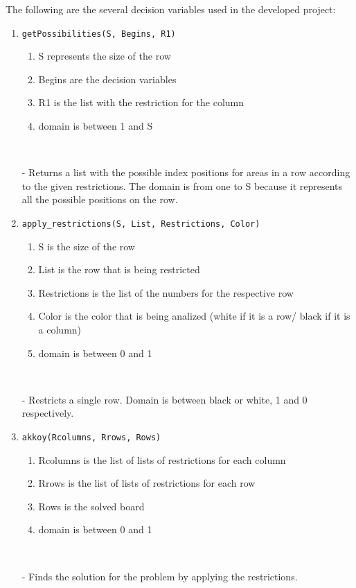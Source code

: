 \documentclass[runningheads,a4paper]{llncs}
\begin{document}
	The following are the several decision variables used in the developed project: 
		\begin{enumerate}
			\item \verb|getPossibilities(S, Begins, R1)|
			\begin{enumerate}
				\item S represents the size of the row
				\item Begins are the decision variables
				\item R1 is the list with the restriction for the column
				\item domain is between 1 and S 
			\end{enumerate}
		\

			 - Returns a list with the possible index positions for areas in a row according to the given restrictions.
			The domain is from one to S because it represents all the possible positions on the row.

			 \item \verb|apply_restrictions(S, List, Restrictions, Color)|
			\begin{enumerate}
				\item S is the size of the row
				\item List is the row that is being restricted
				\item Restrictions is the list of the numbers for the respective row
				\item Color is the color that is being analized (white if it is a row/ black if it is a column)
				\item domain is between 0 and 1
			\end{enumerate}
		\

			- Restricts a single row. Domain is between black or white, 1 and 0 respectively.
	

			\item \verb|akkoy(Rcolumns, Rrows, Rows)|
				\begin{enumerate}
				\item Rcolumns is the list of lists of restrictions for each column
				\item Rrows is the list of lists of restrictions for each row
				\item Rows is the solved board
				\item domain is between 0 and 1
			\end{enumerate}
		\

			- Finds the solution for the problem by applying the restrictions.
		\end{enumerate}
		
\end{document}
